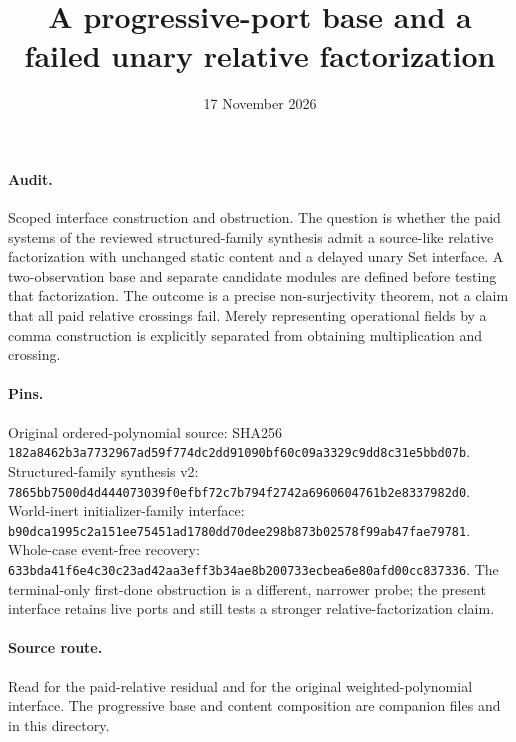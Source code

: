 \documentclass[11pt]{article}\usepackage{amsmath,amssymb,amsthm,geometry}\geometry{margin=1in}
\title{A progressive-port base and a failed unary relative factorization}
\date{17 November 2026}
\begin{document}
\maketitle
\paragraph{Audit.} Scoped interface construction and obstruction. The question is whether the paid systems of the reviewed structured-family synthesis admit a source-like relative factorization with unchanged static content and a delayed unary Set interface. A two-observation base and separate candidate modules are defined before testing that factorization. The outcome is a precise non-surjectivity theorem, not a claim that all paid relative crossings fail. Merely representing operational fields by a comma construction is explicitly separated from obtaining multiplication and crossing.

\paragraph{Pins.} Original ordered-polynomial source: SHA256 \texttt{182a8462b3a7732967ad59f774dc2dd91090bf60c09a3329c9dd8c31e5bbd07b}. Structured-family synthesis v2: \texttt{7865bb7500d4d444073039f0efbf72c7b794f2742a6960604761b2e8337982d0}. World-inert initializer-family interface: \texttt{b90dca1995c2a151ee75451ad1780dd70dee298b873b02578f99ab47fae79781}. Whole-case event-free recovery: \texttt{633bda41f6e4c30c23ad42aa3eff3b34ae8b200733ecbea6e80afd00cc837336}. The terminal-only first-done obstruction is a different, narrower probe; the present interface retains live ports and still tests a stronger relative-factorization claim.

\paragraph{Source route.} Read \texttt{} for the paid-relative residual and \texttt{} for the original weighted-polynomial interface. The progressive base and content composition are companion files \texttt{} and \texttt{} in this directory.
\end{document}
